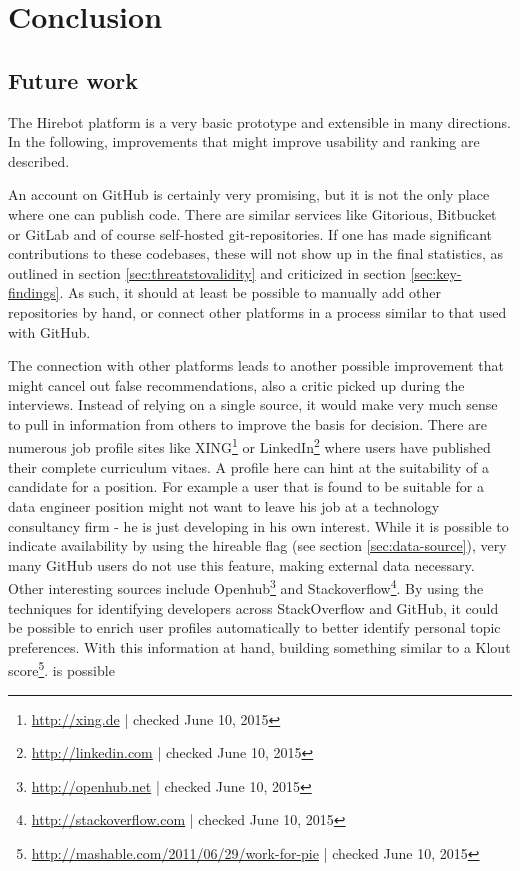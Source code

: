 \chapter{Conclusion}\label{ch:conclusion}
\section{Future work}\label{sec:future-work}
The Hirebot platform is a very basic prototype and extensible in many directions. In the following, improvements that might improve usability and ranking are described.

An account on GitHub is certainly very promising, but it is not the only place where one can publish code. There are similar services like Gitorious, Bitbucket or GitLab and of course self-hosted git-repositories. If one has made significant contributions to these codebases, these will not show up in the final statistics, as outlined in section \ref{sec:threatstovalidity} and criticized in section \ref{sec:key-findings}. As such, it should at least be possible to manually add other repositories by hand, or connect other platforms in a process similar to that used with GitHub.

The connection with other platforms leads to another possible improvement that might cancel out false recommendations, also a critic picked up during the interviews. Instead of relying on a single source, it would make very much sense to pull in information from others to improve the basis for decision. There are numerous job profile sites like XING\footnote{\url{http://xing.de} | checked June 10, 2015} or LinkedIn\footnote{\url{http://linkedin.com} | checked June 10, 2015} where users have published their complete curriculum vitaes. A profile here can hint at the suitability of a candidate for a position. For example a user that is found to be suitable for a data engineer position might not want to leave his job at a technology consultancy firm - he is just developing in his own interest. While it is possible to indicate availability by using the hireable flag (see section \ref{sec:data-source}), very many GitHub users do not use this feature, making external data necessary. Other interesting sources include Openhub\footnote{\url{http://openhub.net} | checked June 10, 2015} and Stackoverflow\footnote{\url{http://stackoverflow.com} | checked June 10, 2015}. By using the techniques for identifying developers across StackOverflow and GitHub\cite{vfs:2012}, it could be possible to enrich user profiles automatically to better identify personal topic preferences. With this information at hand, building something similar to a Klout score\footnote{\url{http://mashable.com/2011/06/29/work-for-pie} | checked June 10, 2015}. is possible

